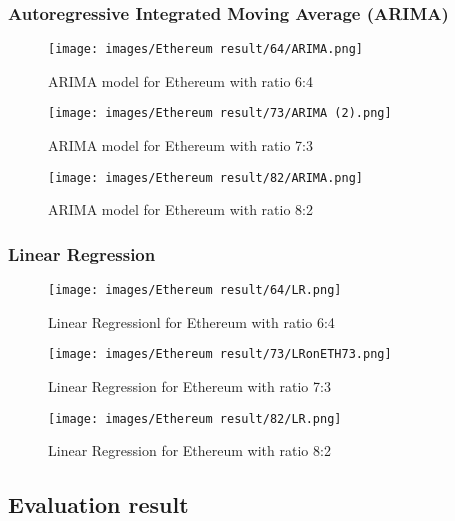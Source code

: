 \documentclass{ieeeojies}
\begin{document}
\subsubsection{Autoregressive Integrated Moving Average (ARIMA)}
\begin{figure}[H]
  \centering
\texttt{[image: images/Ethereum result/64/ARIMA.png]}\\
  \caption{ARIMA model for Ethereum with ratio 6:4}
  \label{fig:AutoFormer_eth_64}
\end{figure}

\begin{figure}[H]
  \centering
\texttt{[image: images/Ethereum result/73/ARIMA (2).png]}\\
  \caption{ARIMA model for Ethereum with ratio 7:3}
  \label{fig:AutoFormer_eth_73}
\end{figure}

\begin{figure}[H]
  \centering
\texttt{[image: images/Ethereum result/82/ARIMA.png]}\\
  \caption{ARIMA model for Ethereum with ratio 8:2}
  \label{fig:AutoFormer_eth_82}
\end{figure}

\subsubsection{Linear Regression}
\begin{figure}[H]
  \centering
\texttt{[image: images/Ethereum result/64/LR.png]}\\
  \caption{Linear Regressionl for Ethereum with ratio 6:4}
  \label{fig:LR_eth_64}
\end{figure}

\begin{figure}[H]
  \centering
\texttt{[image: images/Ethereum result/73/LRonETH73.png]}\\
  \caption{Linear Regression for Ethereum with ratio 7:3}
  \label{fig:LR_eth_73}
\end{figure}

\begin{figure}[H]
  \centering
\texttt{[image: images/Ethereum result/82/LR.png]}\\
  \caption{Linear Regression for Ethereum with ratio 8:2}
  \label{fig:LR_eth_82}
\end{figure}



\subsection{Evaluation result}
\end{document}
